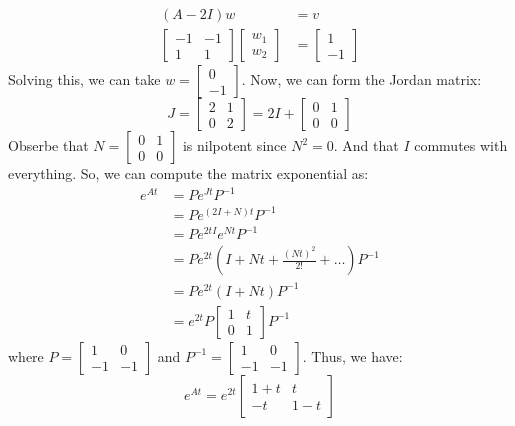\documentclass[11pt]{article}
\begin{document}
\begin{example}
    \begin{align*}
        (A - 2I)w &= v \\
        \begin{bmatrix}
        -1 & -1 \\
        1 & 1
        \end{bmatrix} \begin{bmatrix}
        w_1 \\ w_2
        \end{bmatrix} &= \begin{bmatrix}1 \\ -1
        \end{bmatrix}
    \end{align*}
    Solving this, we can take \( w = \begin{bmatrix}0 \\ -1 \end{bmatrix} \). Now, we can form the Jordan matrix:
    $$
    J = \begin{bmatrix}
    2 & 1 \\
    0 & 2
    \end{bmatrix} = 2I + \begin{bmatrix}
    0 & 1 \\
    0 & 0
    \end{bmatrix}
    $$
    Obserbe that $N = \begin{bmatrix}
    0 & 1 \\
    0 & 0
    \end{bmatrix}$ is nilpotent since $N^2 = 0$. And that $I$ commutes with everything. So, we can compute the matrix exponential as:
    \begin{align*}
        e^{At} &= Pe^{Jt}P^{-1} \\
        &= P e^{(2I + N)t} P^{-1} \\
        &= P e^{2tI} e^{Nt} P^{-1} \\
        &= P e^{2t} \left(I + Nt + \frac{(Nt)^2}{2!} + \ldots \right) P^{-1} \\
        &= P e^{2t} \left(I + Nt\right) P^{-1} \\
        &= e^{2t} P \begin{bmatrix}
        1 & t \\
        0 & 1
        \end{bmatrix} P^{-1}
    \end{align*}
    where \( P = \begin{bmatrix}1 & 0 \\
    -1 & -1
    \end{bmatrix} \) and \( P^{-1} = \begin{bmatrix}
    1 & 0 \\
    -1 & -1
    \end{bmatrix} \). Thus, we have:
    $$
        e^{At} = e^{2t} \begin{bmatrix}1 + t & t \\
        -t & 1 - t
        \end{bmatrix}
    $$
\end{example}
\end{document}
